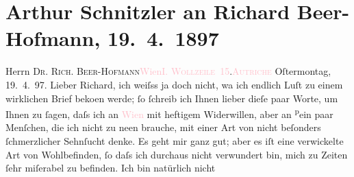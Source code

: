 

               \section[Arthur Schnitzler an Richard Beer-Hofmann, 19. 4. 1897]{ Arthur Schnitzler an Richard Beer-Hofmann, 19. 4. 1897}\nopagebreak{}\rehead{ }\normalsize\beginnumbering{} \toendnotes[C]{\smallbreak\pagebreak[2]} 
\toendnotes[C]{\smallbreak}\pstart{}{\pb}Herrn \textsc{Dr. Rich.
                     Beer-Hofmann}\pend{}\pstart{}\textcolor{pink}{Wien}{}\ledrightnote{\textcolor{pink}{Wien}}\pend{}\pstart{}\textcolor{pink}{\textsc{I. Wollzeile 15}}{}\ledrightnote{\textcolor{pink}{Wollzeile}}.\pend{}\pstart{}\textsc{\textcolor{pink}{Autriche}{}\ledrightnote{\textcolor{pink}{Österreich}}}\pend{}{\bigskip}\pstart
           \raggedleft{}{\pb}Oſtermontag, 19. 4. 97.\pend
           \pstart
           Lieber Richard, ich weiſss ja doch nicht, wa{\geminationn} ich endlich Luſt zu einem wirklichen Brief beko{\geminationm}en werde; ſo ſchreib ich Ihnen lieber dieſe paar Worte,
               um Ihnen zu ſagen, daſs ich an \textcolor{pink}{Wien}{}\ledrightnote{\textcolor{pink}{Wien}} mit heftigem
               Widerwillen, aber an \substVorne{}\textsuperscript{p}\substDazwischen{}e\substHinten{}in paar Menſchen, die ich nicht zu ne{\geminationn}en
               brauche, mit einer Art \introOben{}von\introOben{} nicht beſonders {\pb}ſchmerzlicher Sehnſucht denke. Es geht mir ganz gut;
               aber es iſt eine verwickelte Art von Wohlbefinden, ſo daſs ich durchaus nicht
               verwundert bin, mich zu Zeiten ſehr miſerabel zu befinden. Ich bin natürlich nicht
